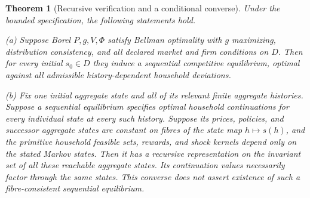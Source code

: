 \documentclass[11pt,a4paper]{article}
\newtheorem{theorem}{Theorem}
\theoremstyle{definition}
\begin{document}
\begin{theorem}[Recursive verification and a conditional converse]
Under the bounded specification, the following statements hold.

(a) Suppose Borel $P,g,V,\Phi$ satisfy Bellman optimality with $g$ maximizing, distribution consistency, and all declared market and firm conditions on $D$. Then for every initial $s_0\in D$ they induce a sequential competitive equilibrium, optimal against all admissible history-dependent household deviations.

(b) Fix one initial aggregate state and all of its relevant finite aggregate histories. Suppose a sequential equilibrium specifies optimal household continuations for every individual state at every such history. Suppose its prices, policies, and successor aggregate states are constant on fibres of the state map $h\mapsto s(h)$, and the primitive household feasible sets, rewards, and shock kernels depend only on the stated Markov states. Then it has a recursive representation on the invariant set of all these reachable aggregate states. Its continuation values necessarily factor through the same states. This converse does not assert existence of such a fibre-consistent sequential equilibrium.
\end{theorem}
\end{document}
